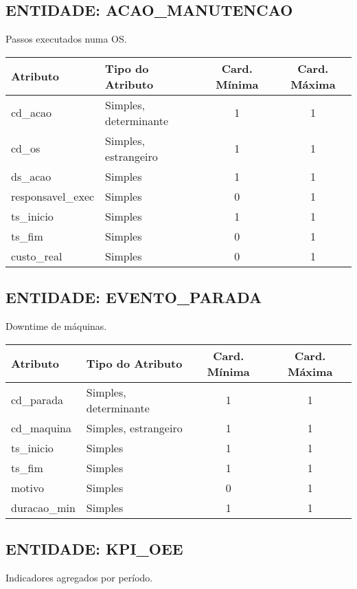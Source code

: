 \documentclass[10pt,a4paper]{article}
\begin{document}
\subsection*{ENTIDADE: ACAO\_MANUTENCAO}
Passos executados numa OS.
\begin{center}
\begin{tabular}{| l | l | c | c |}
\hline
\rowcolor{red}\color{white}\textbf{Atributo} & \color{white}\textbf{Tipo do Atributo} & \color{white}\textbf{Card. Mínima} & \color{white}\textbf{Card. Máxima} \\
\hline
cd\_acao & Simples, determinante & 1 & 1 \\
cd\_os & Simples, estrangeiro & 1 & 1 \\
ds\_acao & Simples & 1 & 1 \\
responsavel\_exec & Simples & 0 & 1 \\
ts\_inicio & Simples & 1 & 1 \\
ts\_fim & Simples & 0 & 1 \\
custo\_real & Simples & 0 & 1 \\
\hline
\end{tabular}
\end{center}

\subsection*{ENTIDADE: EVENTO\_PARADA}
Downtime de máquinas.
\begin{center}
\begin{tabular}{| l | l | c | c |}
\hline
\rowcolor{red}\color{white}\textbf{Atributo} & \color{white}\textbf{Tipo do Atributo} & \color{white}\textbf{Card. Mínima} & \color{white}\textbf{Card. Máxima} \\
\hline
cd\_parada & Simples, determinante & 1 & 1 \\
cd\_maquina & Simples, estrangeiro & 1 & 1 \\
ts\_inicio & Simples & 1 & 1 \\
ts\_fim & Simples & 1 & 1 \\
motivo & Simples & 0 & 1 \\
duracao\_min & Simples & 1 & 1 \\
\hline
\end{tabular}
\end{center}

\subsection*{ENTIDADE: KPI\_OEE}
Indicadores agregados por período.
\end{document}
